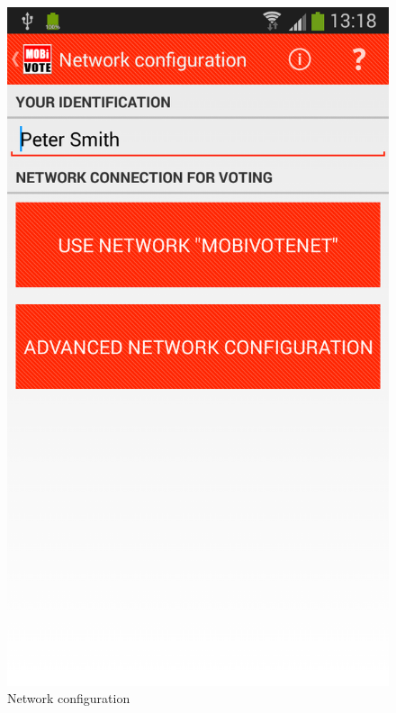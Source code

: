 \documentclass[numbers=noenddot, abstract=on, a4paper, headsepline,
footsepline, oneside, openright, draft=off, listof=leveldown]{scrreprt}
\begin{document}
\begin{figure}[!htb]
	\begin{minipage}{.5\textwidth}
  		\centering
		\includegraphics[height=.4\textheight]{img/screenshots/network_configuration}
		\caption{Network configuration}
		\label{fig:handbook_networkconfiguration}
	\end{minipage}
	\begin{minipage}{.5\textwidth}
  		\centering

\end{minipage}
\end{figure}
\end{document}
